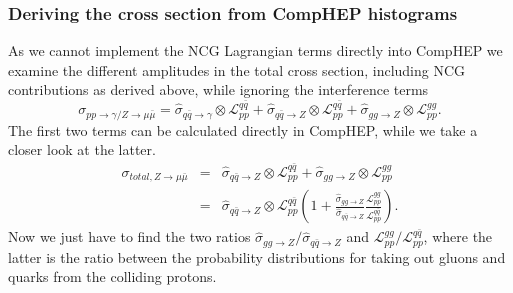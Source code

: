 \subsubsection{Deriving the cross section from CompHEP histograms}
As we cannot implement the NCG Lagrangian terms directly into CompHEP we examine the different amplitudes in the total cross section, including NCG contributions as derived above, while ignoring the interference terms
\begin{equation}
	\sigma_{pp \rightarrow \gamma/ Z \rightarrow \mu \bar \mu} = \hat \sigma_{q \bar q \rightarrow \gamma} \otimes \mathcal{L}_{pp}^{q \bar q}+ \hat \sigma_{q \bar q \rightarrow Z} \otimes \mathcal{L}_{pp}^{q \bar q}+ \hat \sigma_{gg \rightarrow Z} \otimes \mathcal{L}_{pp}^{gg}.
\end{equation}
The first two terms can be calculated directly in CompHEP, while we take a closer look at the latter. 
\begin{eqnarray} \label{eq:qqggztotal}
	\sigma_{total, Z \rightarrow \mu \bar \mu} &=& \hat \sigma_{q \bar q \rightarrow Z} \otimes \mathcal{L}_{pp}^{q \bar q}+ \hat \sigma_{gg \rightarrow Z} \otimes \mathcal{L}_{pp}^{gg} \nonumber \\
	&=&\hat \sigma_{q \bar q \rightarrow Z} \otimes \mathcal{L}_{pp}^{q \bar q} \left (1+ \frac{\hat \sigma_{gg \rightarrow Z}}{\hat \sigma_{q \bar q \rightarrow Z}} \frac{\mathcal{L}_{pp}^{gg}} {\mathcal{L}_{pp}^{q \bar q}} \right ).
\end{eqnarray}
Now we just have to find the two ratios ${\hat \sigma_{gg \rightarrow Z}}/{\hat \sigma_{q \bar q \rightarrow Z}}$ and ${\mathcal{L}_{pp}^{gg}}/{\mathcal{L}_{pp}^{q \bar q}}$, where the latter is the ratio between the probability distributions for taking out gluons and quarks from the colliding protons.

